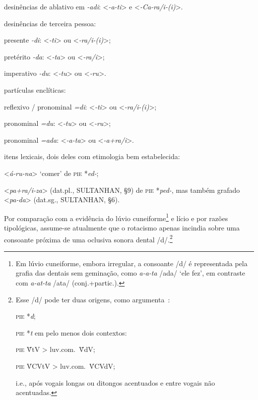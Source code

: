 \begin{compactenum}
	\item desinências de ablativo em \emph{-adi}: <\emph{-a-ti}> e
	<\emph{-Ca-ra\slash{}i-{(i)}}>.
	\item desinências de terceira pessoa:
	\begin{compactenum}
		\item presente \emph{-di}: <\emph{-ti}> ou <\emph{-ra\slash{}i-{(i)}}>;
		\item pretérito \emph{-da}: <\emph{-ta}> ou <\emph{-ra\slash{}i}>;
		\item imperativo \emph{-du}: <\emph{-tu}> ou <\emph{-ru}>.
	\end{compactenum}
	\item partículas enclíticas:
	\begin{compactenum}
		\item reflexivo / pronominal \emph{=di}: <\emph{-ti}> ou <\emph{-ra\slash{}i-{(i)}}>;
		\item pronominal \emph{=du}: <\emph{-tu}> ou <\emph{-ru}>;
		\item pronominal \emph{=ada}: <\emph{-a-ta}> ou <\emph{-a+ra\slash{}i}>.
	\end{compactenum}
	\item itens lexicais, dois deles com etimologia bem estabelecida:
	\begin{compactenum}
		\item <\emph{á-ru-na}> `comer' de \textsc{pie} *\emph{ed-};
		\item <\emph{pa+ra\slash{}i-za}> (dat.pl., SULTANHAN, §9) de
		\textsc{pie} *\emph{ped-}, mas também grafado <\emph{pa-da}> (dat.sg.,
		SULTANHAN, §6).
	\end{compactenum}
\end{compactenum}
Por comparação com a evidência do lúvio cuneiforme\footnote{Em lúvio
	cuneiforme, embora irregular, a consoante /d/ é representada pela grafia das
	dentais sem geminação, como \emph{a-a-ta} /ada/ `ele fez', em contraste com
	\emph{a-at-ta} /ata/ (conj.+partic.).}
e lício e por razões tipológicas, assume-se atualmente que o rotacismo apenas
incindia sobre uma consoante próxima de uma oclusiva sonora dental
/d/.\footnote{Esse /d/ pode ter duas origens, como
	argumenta~\textcite{MorpurgoDavies1982}:
	\begin{inparaenum}
		\item \textsc{pie} *\emph{d};
		\item \textsc{pie} *\emph{t} em pelo menos dois contextos:
		\begin{inparaenum}
			\item \textsc{pie} V̄́tV > luv.com.\ V̄́dV;\@
			\item \textsc{pie} V́CVtV > luv.com.\ V́CVdV;\@
		\end{inparaenum}
	\end{inparaenum}
	i.e., após vogais longas ou ditongos acentuados e entre vogais não acentuadas.
}
